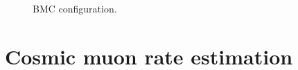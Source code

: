\begin{figure}
    \centering
    \caption{BMC configuration.}
    \label{fig:bmc_configuration}
\end{figure}



\section{Cosmic muon rate estimation}


